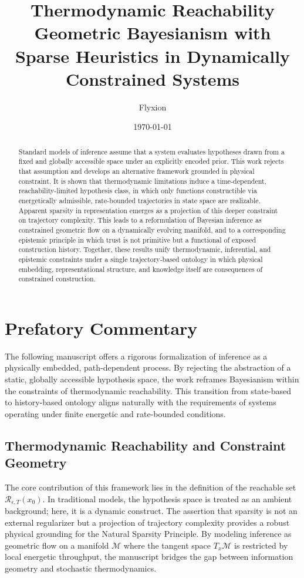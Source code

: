 \documentclass[12pt]{article}
\title{Thermodynamic Reachability\\
\large Geometric Bayesianism with Sparse Heuristics in Dynamically Constrained Systems}
\author{Flyxion}
\date{\today}
\theoremstyle{plain}
\theoremstyle{definition}
\theoremstyle{remark}
\begin{document}
\maketitle

\begin{abstract}
Standard models of inference assume that a system evaluates hypotheses drawn from a fixed and globally accessible space under an explicitly encoded prior. This work rejects that assumption and develops an alternative framework grounded in physical constraint. It is shown that thermodynamic limitations induce a time-dependent, reachability-limited hypothesis class, in which only functions constructible via energetically admissible, rate-bounded trajectories in state space are realizable. Apparent sparsity in representation emerges as a projection of this deeper constraint on trajectory complexity. This leads to a reformulation of Bayesian inference as constrained geometric flow on a dynamically evolving manifold, and to a corresponding epistemic principle in which trust is not primitive but a functional of exposed construction history. Together, these results unify thermodynamic, inferential, and epistemic constraints under a single trajectory-based ontology in which physical embedding, representational structure, and knowledge itself are consequences of constrained construction.
\end{abstract}

\newpage

\section*{Prefatory Commentary}

The following manuscript offers a rigorous formalization of inference as a physically embedded, path-dependent process. By rejecting the abstraction of a static, globally accessible hypothesis space, the work reframes Bayesianism within the constraints of thermodynamic reachability. This transition from state-based to history-based ontology aligns naturally with the requirements of systems operating under finite energetic and rate-bounded conditions.

\subsection*{Thermodynamic Reachability and Constraint Geometry}

The core contribution of this framework lies in the definition of the reachable set $\mathcal{R}_{\epsilon,T}(x_0)$. In traditional models, the hypothesis space is treated as an ambient background; here, it is a dynamic construct. The assertion that sparsity is not an external regularizer but a projection of trajectory complexity provides a robust physical grounding for the Natural Sparsity Principle. By modeling inference as geometric flow on a manifold $\mathcal{M}$ where the tangent space $T_x\mathcal{M}$ is restricted by local energetic throughput, the manuscript bridges the gap between information geometry and stochastic thermodynamics.
\end{document}
